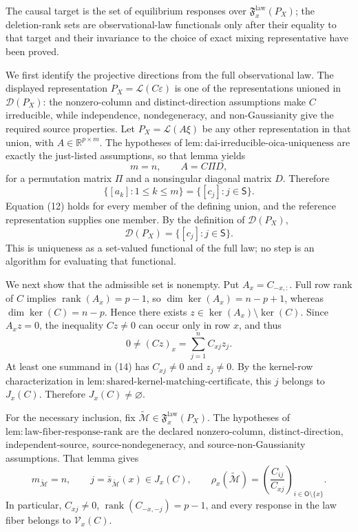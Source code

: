 The causal target is the set of equilibrium responses over \(\mathfrak F_x^{\mathrm{law}}(P_X)\); the deletion-rank sets are observational-law functionals only after their equality to that target and their invariance to the choice of exact mixing representative have been proved.

We first identify the projective directions from the full observational law. The displayed representation \(P_X=\mathcal L(C\varepsilon)\) is one of the representations unioned in \(\mathcal D(P_X)\): the nonzero-column and distinct-direction assumptions make \(C\) irreducible, while independence, nondegeneracy, and non-Gaussianity give the required source properties. Let \(P_X=\mathcal L(A\xi)\) be any other representation in that union, with \(A\in\mathbb R^{p\times m}\). The hypotheses of \(\mathrm{lem{:}dai\text{-}irreducible\text{-}oica\text{-}uniqueness}\) are exactly the just-listed assumptions, so that lemma yields
\[
 m=n,
 \qquad
 A=C\Pi D, \tag{11}
\]
for a permutation matrix \(\Pi\) and a nonsingular diagonal matrix \(D\). Therefore
\[
 \{[a_k]:1\le k\le m\}=\{[c_j]:j\in\mathsf S\}. \tag{12}
\]
Equation (12) holds for every member of the defining union, and the reference representation supplies one member. By the definition of \(\mathcal D(P_X)\),
\[
 \mathcal D(P_X)=\{[c_j]:j\in\mathsf S\}. \tag{13}
\]
This is uniqueness as a set-valued functional of the full law; no step is an algorithm for evaluating that functional.

We next show that the admissible set is nonempty. Put \(A_x=C_{-x,:}\). Full row rank of \(C\) implies \(\operatorname{rank}(A_x)=p-1\), so \(\dim\ker(A_x)=n-p+1\), whereas \(\dim\ker(C)=n-p\). Hence there exists \(z\in\ker(A_x)\setminus\ker(C)\). Since \(A_xz=0\), the inequality \(Cz\ne0\) can occur only in row \(x\), and thus
\[
 0\ne(Cz)_x=\sum_{j=1}^n C_{xj}z_j. \tag{14}
\]
At least one summand in (14) has \(C_{xj}\ne0\) and \(z_j\ne0\). By the kernel-row characterization in \(\mathrm{lem{:}shared\text{-}kernel\text{-}matching\text{-}certificate}\), this \(j\) belongs to \(J_x(C)\). Therefore \(J_x(C)\ne\varnothing\).

For the necessary inclusion, fix \(\widetilde{\mathcal M}\in\mathfrak F_x^{\mathrm{law}}(P_X)\). The hypotheses of \(\mathrm{lem{:}law\text{-}fiber\text{-}response\text{-}rank}\) are the declared nonzero-column, distinct-direction, independent-source, source-nondegeneracy, and source-non-Gaussianity assumptions. That lemma gives
\[
 m_{\widetilde{\mathcal M}}=n,
 \qquad
 j=\bar s_{\widetilde{\mathcal M}}(x)\in J_x(C),
 \qquad
 \rho_x(\widetilde{\mathcal M})
 =\left(\frac{C_{ij}}{C_{xj}}\right)_{i\in\mathsf O\setminus\{x\}}. \tag{15}
\]
In particular, \(C_{xj}\ne0\), \(\operatorname{rank}(C_{-x,-j})=p-1\), and every response in the law fiber belongs to \(\mathcal V_x(C)\).

